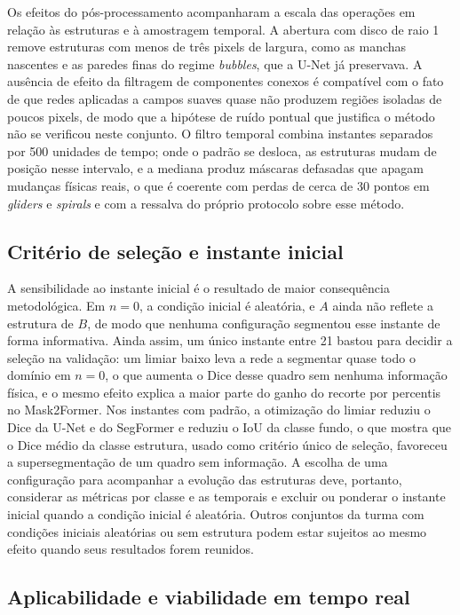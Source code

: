 \documentclass[final,5p,times,twocolumn]{elsarticle}
\begin{document}
Os efeitos do pós-processamento acompanharam a escala das operações em relação às estruturas e à amostragem temporal. A abertura com disco de raio 1 remove estruturas com menos de três pixels de largura, como as manchas nascentes e as paredes finas do regime \textit{bubbles}, que a U-Net já preservava. A ausência de efeito da filtragem de componentes conexos é compatível com o fato de que redes aplicadas a campos suaves quase não produzem regiões isoladas de poucos pixels, de modo que a hipótese de ruído pontual que justifica o método não se verificou neste conjunto. O filtro temporal combina instantes separados por 500 unidades de tempo; onde o padrão se desloca, as estruturas mudam de posição nesse intervalo, e a mediana produz máscaras defasadas que apagam mudanças físicas reais, o que é coerente com perdas de cerca de 30 pontos em \textit{gliders} e \textit{spirals} e com a ressalva do próprio protocolo sobre esse método.

\subsection{Critério de seleção e instante inicial}\label{subsec:disc_n0}

A sensibilidade ao instante inicial é o resultado de maior consequência metodológica. Em $n=0$, a condição inicial é aleatória, e $A$ ainda não reflete a estrutura de $B$, de modo que nenhuma configuração segmentou esse instante de forma informativa. Ainda assim, um único instante entre 21 bastou para decidir a seleção na validação: um limiar baixo leva a rede a segmentar quase todo o domínio em $n=0$, o que aumenta o Dice desse quadro sem nenhuma informação física, e o mesmo efeito explica a maior parte do ganho do recorte por percentis no Mask2Former. Nos instantes com padrão, a otimização do limiar reduziu o Dice da U-Net e do SegFormer e reduziu o IoU da classe fundo, o que mostra que o Dice médio da classe estrutura, usado como critério único de seleção, favoreceu a supersegmentação de um quadro sem informação. A escolha de uma configuração para acompanhar a evolução das estruturas deve, portanto, considerar as métricas por classe e as temporais e excluir ou ponderar o instante inicial quando a condição inicial é aleatória. Outros conjuntos da turma com condições iniciais aleatórias ou sem estrutura podem estar sujeitos ao mesmo efeito quando seus resultados forem reunidos.

\subsection{Aplicabilidade e viabilidade em tempo real}\label{subsec:disc_realtime}
\end{document}
